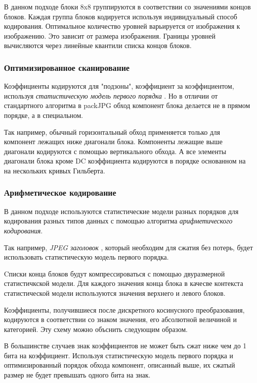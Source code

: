 \documentclass{matmex-diploma-custom}
\begin{document}
В данном подходе блоки 8x8 группируются в соответствии со значениями концов блоков. Каждая группа блоков кодируется используя индивидуальный способ кодирования. Оптимальное количество уровней варьируется от изображения к изображению. Это зависит от размера изображения. Границы уровней вычисляются через линейные квантили списка концов блоков.

\subsubsection{Оптимизированное сканирование}
Коэффициенты кодируются для "подзоны", коэффициент за коэффициентом, используя \emph{статистическую модель первого порядка} \cite{ariph-coding}. Но в отличии от стандартного алгоритма в packJPG обход компонент блока делается не в прямом порядке, а в специальном.

Так например, обычный горизонтальный обход применяется только для компонент лежащих ниже диагонали блока. Компоненты лежащие выше диагонали кодируются с помощью вертикального обхода. А все элементы диагонали блока кроме DC коэффициента кодируются в порядке основанном на на нескольких кривых Гильберта.

\subsubsection{Арифметическое кодирование}

В данном подходе используются статистические модели разных порядков для кодирования разных типов данных с помощью алгоритма  \emph{арифметического кодирования}.

Так например, \emph{JPEG заголовок} \cite{jpeg-spec}, который необходим для сжатия без потерь, будет использовать статистическую модель первого порядка.

Cписки конца блоков будут компрессироваться с помощью двуразмерной статистичкской модели. Для каждого значения конца блока в качесве контекста статистической модели используются значения верхнего и левого блоков.

Коэффициенты, получившиеся после дискретного косинусного преобразования, кодируются в соответствии со знаком значения, его абсолютной величиной и категорией. Эту схему можно объснить следующим образом.

В большинстве случаев знак коэффициентов не может быть сжат ниже чем до 1 бита на коэффициент. Используя статистическую модель первого порядка и оптимизированный порядок обхода компонент, описанный выше, их сжатый размер не будет превышать одного бита на знак.
\end{document}
